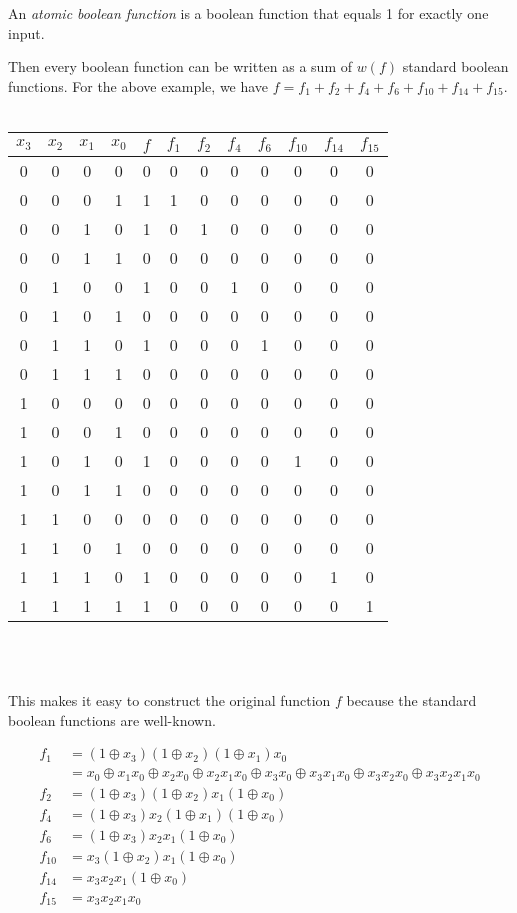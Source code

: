 \begin{definition}
  An {\em atomic boolean function} is a boolean function that equals 1 for exactly
  one input.
\end{definition}

Then every boolean function can be written as a sum of $w(f)$ standard boolean
functions. For the above example, we have $f=f_1+f_2+f_4+f_6+f_{10}+f_{14}+f_{15}$.
\\
\\
\begin{tabular}{|c|c|c|c|c|c|c|c|c|c|c|c|}
  \hline
  $x_3$&$x_2$&$x_1$&$x_0$&$f$&$f_1$&$f_2$&$f_4$&$f_6$&$f_{10}$&$f_{14}$&$f_{15}$\\
  \hline
  0&0&0&0&0&0&0&0&0&0&0&0\\
  0&0&0&1&1&1&0&0&0&0&0&0\\
  0&0&1&0&1&0&1&0&0&0&0&0\\
  0&0&1&1&0&0&0&0&0&0&0&0\\
  0&1&0&0&1&0&0&1&0&0&0&0\\
  0&1&0&1&0&0&0&0&0&0&0&0\\
  0&1&1&0&1&0&0&0&1&0&0&0\\
  0&1&1&1&0&0&0&0&0&0&0&0\\
  1&0&0&0&0&0&0&0&0&0&0&0\\
  1&0&0&1&0&0&0&0&0&0&0&0\\
  1&0&1&0&1&0&0&0&0&1&0&0\\
  1&0&1&1&0&0&0&0&0&0&0&0\\
  1&1&0&0&0&0&0&0&0&0&0&0\\
  1&1&0&1&0&0&0&0&0&0&0&0\\
  1&1&1&0&1&0&0&0&0&0&1&0\\
  1&1&1&1&1&0&0&0&0&0&0&1\\
  \hline
\end{tabular}
\\
\\
\par This makes it easy to construct the original function $f$ because
the standard boolean functions are well-known.

\begin{align*}
  f_1   &=(1\oplus x_3)(1\oplus x_2)(1\oplus x_1)x_0\\
        &=x_0 \oplus x_1x_0 \oplus x_2x_0 \oplus x_2x_1x_0 \oplus x_3x_0 \oplus x_3x_1x_0
        \oplus x_3x_2x_0 \oplus x_3x_2x_1x_0\\
  f_2   &=(1\oplus x_3)(1\oplus x_2)x_1(1\oplus x_0)\\
  f_4   &=(1\oplus x_3)x_2(1\oplus x_1)(1\oplus x_0)\\
  f_6   &=(1\oplus x_3)x_2x_1(1\oplus x_0)\\
  f_{10}&=x_3(1\oplus x_2)x_1(1\oplus x_0)\\
  f_{14}&=x_3x_2x_1(1\oplus x_0)\\
  f_{15}&=x_3x_2x_1x_0\\
\end{align*}

